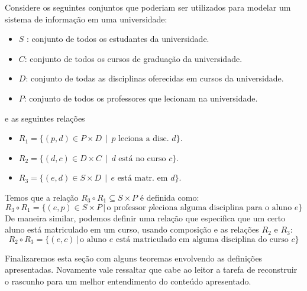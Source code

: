 \begin{Example}
Considere os seguintes conjuntos que poderiam ser utilizados para
modelar um sistema de informação em uma universidade:
\begin{itemize}
  \item $S$ : conjunto de todos os estudantes da universidade.
  \item $C$: conjunto de todos os cursos de graduação da universidade.
  \item $D$: conjunto de todas as disciplinas oferecidas em cursos da
    universidade.
  \item $P$: conjunto de todos os professores que lecionam na universidade.
\end{itemize}
e as seguintes relações
\begin{itemize}
	\item $R_1 = \{(p,d)\in P \times D \,\mid\,\text{$p$ leciona a disc. } d\}$.
	\item $R_2 = \{(d,c)\in D \times C\,\mid\,\text{$d$ est\'a no curso $c$}\}$.
	\item $R_3 = \{(e,d)\in S\times D\,\mid\,\text{$e$ est\'a matr. em $d$}\}$.
\end{itemize}
Temos que a relação $R_3 \circ R_1 \subseteq S \times P$ é definida
como:
\[
R_3 \circ R_1 =\{(e,p) \in S \times P \,|\,\text{o professor $p$
  leciona alguma disciplina para o aluno $e$}\}
\]
De maneira similar, podemos definir uma relação que especifica que um
certo aluno está matriculado em um curso, usando composição e as
relações $R_2$ e $R_3$:
\[
R_2 \circ R_3 =\{(e,c)\,|\,\text{o aluno $e$ está matriculado em
  alguma disciplina do curso $c$}\}
\]
\end{Example}

Finalizaremos esta seção com alguns teoremas envolvendo as definições
apresentadas. Novamente vale ressaltar que cabe ao leitor a tarefa de
reconstruir o rascunho para um melhor entendimento do conteúdo
apresentado.


